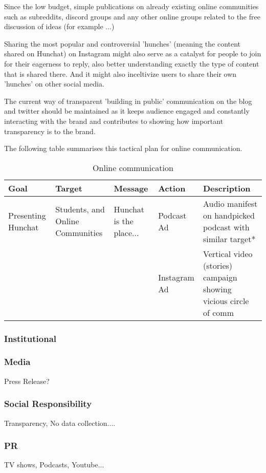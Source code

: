 \documentclass[12pt]{article}
\begin{document}
	Since the low budget, simple publications on already existing online communities such as subreddits, discord groups and any other online groups related to the free discussion of ideas (for example ...)
	
	Sharing the most popular and controversial 'hunches' (meaning the content shared on Hunchat) on Instagram might also serve as a catalyst for people to join for their eagerness to reply, also better understanding exactly the type of content that is shared there. And it might also inceltivize users to share their own 'hunches' on other social media.

	The current way of transparent 'building in public' communication on the blog and twitter should be maintained as it keeps audience engaged and constantly interacting with the brand and contributes to showing how important transparency is to the brand.
	
	The following table summarises this tactical plan for online communication.
	
	\begin{table}[htbp]
	\small
	\caption{Online communication}
	\label{table:online}
	\centering
	\begin{tabular}{ @{}P{0.12\textwidth}P{0.15\textwidth}P{0.18\textwidth}P{0.1\textwidth}P{0.35\textwidth}@{} }
Goal	&	Target	&	Message	&	Action	&	Description	 \\ \hline
Presenting Hunchat	&	Students, and Online Communities 	& Hunchat is the place... & 	Podcast Ad & Audio manifest on handpicked podcast with similar target* \\
	& 	&	& Instagram Ad & Vertical video (stories) campaign showing vicious circle of comm
 	\\ \hline
	\end{tabular}
	\end{table}
	
	
	\subsubsection{Institutional}
	
	\subsubsection{Media}
	Press Release?
	\subsubsection{Social Responsibility}
	Transparency, No data collection....
	\subsubsection{PR}
	TV shows, Podcasts, Youtube...
\end{document}
